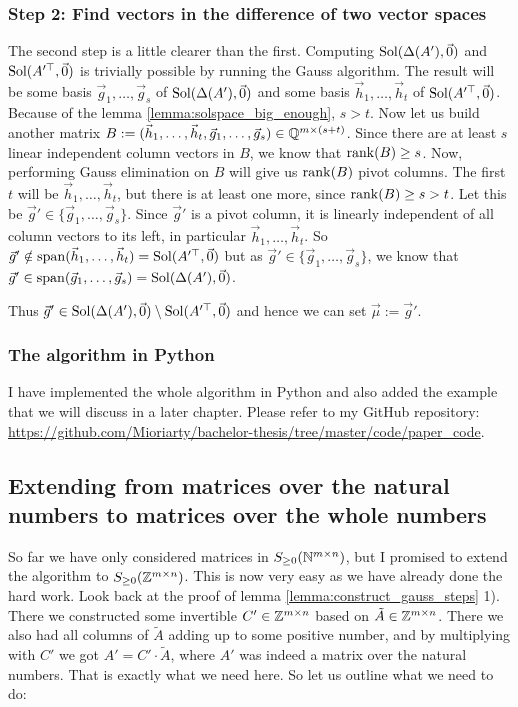 \subsubsection{Step 2: Find vectors in the difference of two vector spaces}
The second step is a little clearer than the first. Computing $\operatorname{Sol}(\Delta(A'), \vec0)$ and $\operatorname{Sol}(A'^\top, \vec0)$ is trivially possible by running the Gauss algorithm. The result will be some basis $\vec g_{1}, \dots, \vec g_s$ of $\operatorname{Sol}(\Delta(A'), \vec0)$ and some basis $\vec h_1, \dots, \vec h_t$ of $\operatorname{Sol}(A'^\top, \vec0)$. Because of the lemma \ref{lemma:solspace_big_enough}, $s > t$. Now let us build another matrix $B := (\vec h_1, \dots, \vec h_t, \vec g_{1}, \dots, \vec g_s) \in \mathbb{Q}^{m\times(s+t)}$. Since there are at least $s$ linear independent column vectors in $B$, we know that $\operatorname{rank}(B)\geq s$. Now, performing Gauss elimination on $B$ will give us $\operatorname{rank}(B)$ pivot columns. The first $t$ will be $\vec h_1, \dots, \vec h_t$, but there is at least one more, since $\operatorname{rank}(B)\geq s > t$. Let this be $\vec g' \in \{\vec g_{1}, \dots, \vec g_s\}$. Since $\vec g'$ is a pivot column, it is linearly independent of all column vectors to its left, in particular $\vec h_1, \dots, \vec h_t$. So $\vec g' \notin \operatorname{span}(\vec h_1, \dots, \vec h_t) = \operatorname{Sol}(A'^\top, \vec0)$ but as $\vec g' \in \{\vec g_{1}, \dots, \vec g_s\}$, we know that $\vec g' \in \operatorname{span}(\vec g_{1}, \dots, \vec g_s) = \operatorname{Sol}(\Delta(A'), \vec0)$.

Thus $\vec g' \in \operatorname{Sol}(\Delta(A'), \vec0)\setminus\operatorname{Sol}(A'^\top, \vec0)$ and hence we can set $\vec\mu := \vec g'$.

\subsubsection{The algorithm in Python}
I have implemented the whole algorithm in Python and also added the example that we will discuss in a later chapter. Please refer to my GitHub repository: \url{https://github.com/Mioriarty/bachelor-thesis/tree/master/code/paper_code}.

\subsection{Extending from matrices over the natural numbers to matrices over the whole numbers}
So far we have only considered matrices in $S_{\geq 0}(\mathbb{N}^{m \times n})$, but I promised to extend the algorithm to $S_{\geq 0}(\mathbb{Z}^{m \times n})$. This is now very easy as we have already done the hard work. Look back at the proof of lemma \ref{lemma:construct_gauss_steps} 1). There we constructed some invertible $C'\in\mathbb{Z}^{m \times n}$ based on $\tilde A \in \mathbb{Z}^{m \times n}$. There we also had all columns of $\tilde A$ adding up to some positive number, and by multiplying with $C'$ we got $A' = C' \cdot \tilde A$, where $A'$ was indeed a matrix over the natural numbers. That is exactly what we need here. So let us outline what we need to do:

